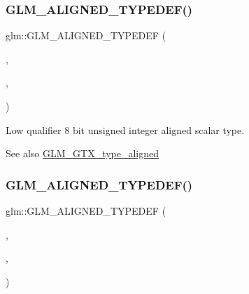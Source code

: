 \subsubsection{\texorpdfstring{G\+L\+M\+\_\+\+A\+L\+I\+G\+N\+E\+D\+\_\+\+T\+Y\+P\+E\+D\+E\+F()}{GLM\_ALIGNED\_TYPEDEF()}\hspace{0.1cm}{\footnotesize\ttfamily [69/209]}}
{\footnotesize\ttfamily glm\+::\+G\+L\+M\+\_\+\+A\+L\+I\+G\+N\+E\+D\+\_\+\+T\+Y\+P\+E\+D\+EF (\begin{DoxyParamCaption}\item[{\mbox{\hyperlink{group__gtc__type__precision_ga4d9dc08b7b248a386dfe9afd00fc6b1e}{lowp\+\_\+uint8}}}]{,  }\item[{aligned\+\_\+lowp\+\_\+uint8}]{,  }\item[{1}]{ }\end{DoxyParamCaption})}

Low qualifier 8 bit unsigned integer aligned scalar type. \begin{DoxySeeAlso}{See also}
\mbox{\hyperlink{group__gtx__type__aligned}{G\+L\+M\+\_\+\+G\+T\+X\+\_\+type\+\_\+aligned}} 
\end{DoxySeeAlso}
\mbox{\label{group__gtx__type__aligned_ga1246094581af624aca6c7499aaabf801}} 
\subsubsection{\texorpdfstring{G\+L\+M\+\_\+\+A\+L\+I\+G\+N\+E\+D\+\_\+\+T\+Y\+P\+E\+D\+E\+F()}{GLM\_ALIGNED\_TYPEDEF()}\hspace{0.1cm}{\footnotesize\ttfamily [70/209]}}
{\footnotesize\ttfamily glm\+::\+G\+L\+M\+\_\+\+A\+L\+I\+G\+N\+E\+D\+\_\+\+T\+Y\+P\+E\+D\+EF (\begin{DoxyParamCaption}\item[{\mbox{\hyperlink{group__gtc__type__precision_ga9b8409887319f62f06e664f6ca121b9d}{lowp\+\_\+uint16}}}]{,  }\item[{aligned\+\_\+lowp\+\_\+uint16}]{,  }\item[{2}]{ }\end{DoxyParamCaption})}

